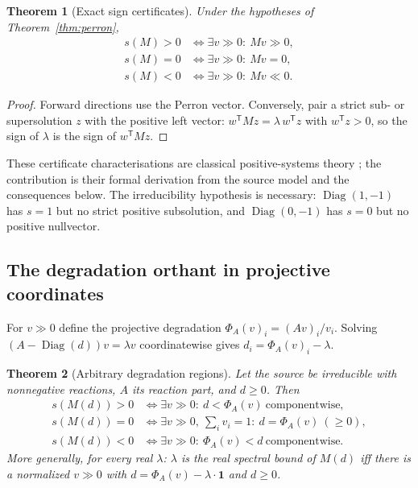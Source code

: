 \documentclass[11pt,a4paper]{article}
\theoremstyle{plain}
\newtheorem{theorem}{Theorem}[section]
\theoremstyle{definition}
\theoremstyle{remark}
\newcommand{\Diag}{\operatorname{Diag}}
\newcommand{\spb}{s}
\newcommand{\Tp}{^{\mathsf T}}
\begin{document}
\begin{theorem}[Exact sign certificates]\label{thm:signs}
Under the hypotheses of Theorem~\ref{thm:perron},
\begin{align*}
\spb(M)>0&\iff\exists v\gg 0:\ Mv\gg 0,\\
\spb(M)=0&\iff\exists v\gg 0:\ Mv=0,\\
\spb(M)<0&\iff\exists v\gg 0:\ Mv\ll 0 .
\end{align*}
\end{theorem}
\begin{proof}
Forward directions use the Perron vector. Conversely, pair a strict sub- or supersolution $z$ with the positive left vector: $w\Tp Mz=\lambda\,w\Tp z$ with $w\Tp z>0$, so the sign of $\lambda$ is the sign of $w\Tp Mz$.
\end{proof}

These certificate characterisations are classical positive-systems theory \cite{bermanplemmons1994,farinarinaldi2000}; the contribution is their formal derivation from the source model and the consequences below. The irreducibility hypothesis is necessary: $\Diag(1,-1)$ has $\spb=1$ but no strict positive subsolution, and $\Diag(0,-1)$ has $\spb=0$ but no positive nullvector.

\subsection{The degradation orthant in projective coordinates}

For $v\gg 0$ define the projective degradation $\Phi_A(v)_i=(Av)_i/v_i$. Solving $(A-\Diag(d))v=\lambda v$ coordinatewise gives $d_i=\Phi_A(v)_i-\lambda$.

\begin{theorem}[Arbitrary degradation regions]\label{thm:regions}
Let the source be irreducible with nonnegative reactions, $A$ its reaction part, and $d\ge 0$. Then
\begin{align*}
\spb(M(d))>0 &\iff \exists v\gg 0:\ d<\Phi_A(v)\ \text{componentwise},\\
\spb(M(d))=0 &\iff \exists v\gg 0,\ \textstyle\sum_i v_i=1:\ d=\Phi_A(v)\ (\ge 0),\\
\spb(M(d))<0 &\iff \exists v\gg 0:\ \Phi_A(v)<d\ \text{componentwise}.
\end{align*}
More generally, for every real $\lambda$: $\lambda$ is the real spectral bound of $M(d)$ iff there is a normalized $v\gg 0$ with $d=\Phi_A(v)-\lambda\cdot\mathbf 1$ and $d\ge 0$.
\end{theorem}
\end{document}
